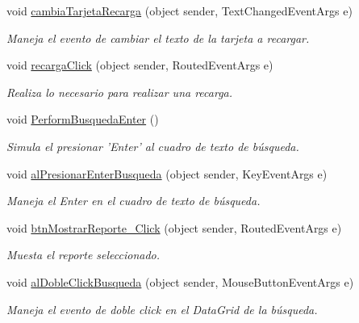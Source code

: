 \begin{DoxyCompactItemize}
void \hyperlink{class_proyecto___integrador__3_1_1_main_window_ae62fbb5bc9da0f805d207465ef0ac41a}{cambia\-Tarjeta\-Recarga} (object sender, Text\-Changed\-Event\-Args e)
\begin{DoxyCompactList}\small\item\em Maneja el evento de cambiar el texto de la tarjeta a recargar. \end{DoxyCompactList}\item 
void \hyperlink{class_proyecto___integrador__3_1_1_main_window_a68df3d7dfa33cf79e6c178960b20c096}{recarga\-Click} (object sender, Routed\-Event\-Args e)
\begin{DoxyCompactList}\small\item\em Realiza lo necesario para realizar una recarga. \end{DoxyCompactList}\item 
void \hyperlink{class_proyecto___integrador__3_1_1_main_window_a871df14819bade692bdb4afb14fc9c45}{Perform\-Busqueda\-Enter} ()
\begin{DoxyCompactList}\small\item\em Simula el presionar 'Enter' al cuadro de texto de búsqueda. \end{DoxyCompactList}\item 
void \hyperlink{class_proyecto___integrador__3_1_1_main_window_add266d3adbe6dc3acb7eddcbcbacf80e}{al\-Presionar\-Enter\-Busqueda} (object sender, Key\-Event\-Args e)
\begin{DoxyCompactList}\small\item\em Maneja el Enter en el cuadro de texto de búsqueda. \end{DoxyCompactList}\item 
void \hyperlink{class_proyecto___integrador__3_1_1_main_window_a186922fb90de5a2382e57e431415a09e}{btn\-Mostrar\-Reporte\-\_\-\-Click} (object sender, Routed\-Event\-Args e)
\begin{DoxyCompactList}\small\item\em Muesta el reporte seleccionado. \end{DoxyCompactList}\item 
void \hyperlink{class_proyecto___integrador__3_1_1_main_window_a45bf387a5341eeedd23517408ad9a4c0}{al\-Doble\-Click\-Busqueda} (object sender, Mouse\-Button\-Event\-Args e)
\begin{DoxyCompactList}\small\item\em Maneja el evento de doble click en el Data\-Grid de la búsqueda. \end{DoxyCompactList}\item 

\end{DoxyCompactItemize}
